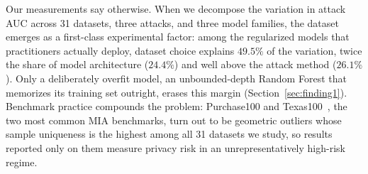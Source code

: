 Our measurements say otherwise. When we decompose the variation in
attack AUC across 31 datasets, three attacks, and three model families,
the dataset emerges as a first-class experimental factor: among the
regularized models that practitioners actually deploy, dataset choice
explains $49.5\%$ of the variation, twice the share of model
architecture ($24.4\%$) and well above the attack method ($26.1\%$).
Only a deliberately overfit model, an unbounded-depth Random Forest that
memorizes its training set outright, erases this margin
(Section~\ref{sec:finding1}). Benchmark practice compounds the problem:
Purchase100 and Texas100~\cite{shokri2017membership}, the two most
common MIA benchmarks, turn out to be geometric outliers whose sample
uniqueness is the highest among all 31 datasets we study, so results
reported only on them measure privacy risk in an unrepresentatively
high-risk regime.

